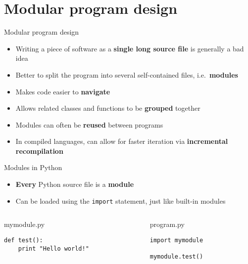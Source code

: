 \part{Modular program design}
\frame{\partpage}

\begin{frame}{Modular program design}
	\begin{itemize}
		\pause\item Writing a piece of software as a
			\textbf{single long source file} is generally a bad idea
		\pause\item Better to split the program into several self-contained files,
			i.e.\ \textbf{modules}
		\pause\item Makes code easier to \textbf{navigate}
		\pause\item Allows related classes and functions to be
			\textbf{grouped} together
		\pause\item Modules can often be \textbf{reused} between programs
		\pause\item In compiled languages, can allow for faster iteration via
			\textbf{incremental recompilation}
	\end{itemize}
\end{frame}

\begin{frame}[fragile]{Modules in Python}
	\begin{itemize}
		\pause\item \textbf{Every} Python source file is a \textbf{module}
		\pause\item Can be loaded using the \lstinline{import} statement,
			just like built-in modules
	\end{itemize}
	\begin{columns}
		\begin{column}{0.48\textwidth}
			\pause mymodule.py
			\begin{lstlisting}
def test():
    print "Hello world!"
			\end{lstlisting}
		\end{column}
		\begin{column}{0.48\textwidth}
			\pause program.py
			\begin{lstlisting}
import mymodule

mymodule.test()
			\end{lstlisting}
		\end{column}
	\end{columns}
\end{frame}

